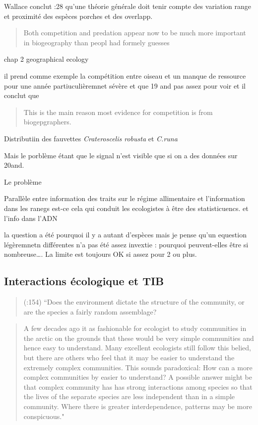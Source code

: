 Wallace conclut :28 qu'une théorie générale doit tenir compte des
variation range et proximité des espèces porches et des overlapp.

\begin{quote}
Both competition and predation appear now to be much more important in
biogeography than peopl had formely guesses
\end{quote}

chap 2 geographical ecology

il prend comme exemple la compétition entre oiseau et un manque de
ressource pour une année partiuculièremnet sévère et que 19 and pas
assez pour voir et il conclut que

\begin{quote}
This is the main reason most evidence for competition is from
biogepgraphers.
\end{quote}

Distributiin des fauvettes \emph{Crateroscelis robusta} et \emph{C.runa}

Mais le porblème étant que le signal n'est visible que si on a des
données sur 20and.

Le problème

Parallèle entre information des traits sur le régime allimentaire et
l'information dans les ranegs est-ce cela qui conduit les ecologistes à
être des statisticuencs. et l'info dans l'ADN

la question a été pourquoi il y a autant d'espèces mais je pense qu'un
equestion légèremnetn différentes n'a pas été assez invextie : pourquoi
peuvent-elles être si nombreuse\ldots{}. La limite est toujours OK si
assez pour 2 ou plus.

\subsection{Interactions écologique et
TIB}\label{interactions-uxe9cologique-et-tib}

\begin{quote}
(:154) ``Does the environment dictate the structure of the community, or
are the species a fairly random assemblage?
\end{quote}

\begin{quote}
A few decades ago it as fashionable for ecologist to study communities
in the arctic on the grounds that these would be very simple communities
and hence easy to understand. Many excellent ecologists still follow
this belied, but there are others who feel that it may be easier to
understand the extremely complex communities. This sounds paradoxical:
How can a more complex communities by easier to understand? A possible
answer might be that complex community has has strong interactions among
species so that the lives of the separate species are less independent
than in a simple community. Where there is greater interdependence,
patterns may be more conspicuous."
\end{quote}

